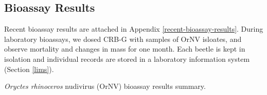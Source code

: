 \documentclass[12pt,letterpaper,english,bibliography=totocnumbered]{scrartcl}
\begin{document}
\subsection{Bioassay Results}

Recent bioassay results are attached in Appendix \ref{recent-bioassay-results}.
During laboratory bioassays, we dosed CRB-G with samples of OrNV isloates, and observe mortality and changes in mass for one month. Each beetle is kept in isolation and individual records are stored in a laboratory information system (Section \ref{lims}).

\begin{table}[h]
		\begin{adjustbox}{width=\columnwidth,center}
			
	 	\begin{threeparttable} 
	\caption{\textit{Oryctes rhinoceros} nudivirus (OrNV) bioassay results summary.}
	 		

\end{threeparttable}
\end{adjustbox}
\end{table}
\end{document}
